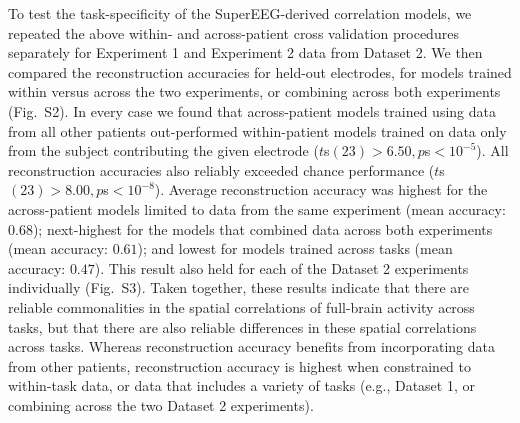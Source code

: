 \documentclass[11pt]{article}
\newcommand{\perexptaskrecon}{S2}
\newcommand{\perexptaskreconseparated}{S3}
\begin{document}
To test the task-specificity of the SuperEEG-derived correlation
models, we repeated the above within- and across-patient cross validation
procedures separately for Experiment 1 and Experiment 2 data from
Dataset 2.  We then compared the reconstruction accuracies for held-out
electrodes, for models trained within versus across the two
experiments, or combining across both experiments
(Fig.~\perexptaskrecon).  In every case we found that across-patient
models trained using data from all other patients out-performed
within-patient models trained on data only from the subject
contributing the given electrode ($t$s$(23) > 6.50, p$s$ < 10^{-5}$).  All
reconstruction accuracies also reliably exceeded chance performance
($t$s$(23) > 8.00, p$s$ < 10^{-8}$).  Average reconstruction accuracy was
highest for the across-patient models limited to data from the same
experiment (mean accuracy: $0.68$); next-highest for the
models that combined data across both experiments (mean
accuracy: $0.61$); and lowest for models trained across tasks (mean
accuracy: $0.47$).  This result also held for each of the Dataset 2
experiments individually (Fig.~\perexptaskreconseparated).  Taken
together, these results indicate that there are reliable commonalities
in the spatial correlations of full-brain activity across tasks, but
that there are also reliable differences in these spatial correlations
across tasks.  Whereas reconstruction accuracy benefits from
incorporating data from other patients, reconstruction accuracy is
highest when constrained to within-task data, or data that includes a
variety of tasks (e.g., Dataset 1, or combining across the two Dataset
2 experiments).
\end{document}

